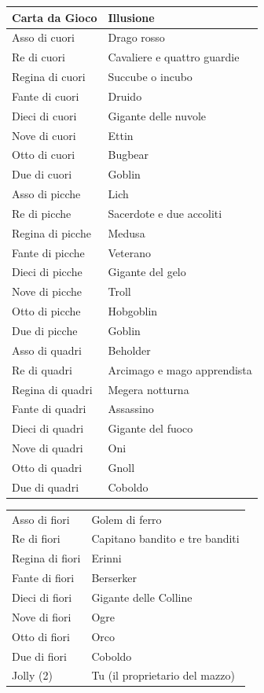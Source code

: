 \begin{multicols}{2}
\begin{tabularx}{0.48\textwidth}{ll}
\textbf{Carta da Gioco} & \textbf{Illusione} \\ \hline
Asso di cuori & Drago rosso \\
Re di cuori & Cavaliere e quattro guardie \\
Regina di cuori & Succube o incubo \\
Fante di cuori & Druido \\
Dieci di cuori & Gigante delle nuvole \\
Nove di cuori & Ettin \\
Otto di cuori & Bugbear \\
Due di cuori & Goblin \\
Asso di picche & Lich \\
Re di picche & Sacerdote e due accoliti \\
Regina di picche & Medusa \\
Fante di picche & Veterano \\
Dieci di picche & Gigante del gelo \\
Nove di picche & Troll \\
Otto di picche & Hobgoblin \\
Due di picche & Goblin \\
Asso di quadri & Beholder \\
Re di quadri & Arcimago e mago apprendista \\
Regina di quadri & Megera notturna \\
Fante di quadri & Assassino \\
Dieci di quadri & Gigante del fuoco \\
Nove di quadri & Oni \\
Otto di quadri & Gnoll \\
Due di quadri & Coboldo \\
\end{tabularx}
\begin{tabularx}{0.48\textwidth}{ll}
Asso di fiori & Golem di ferro \\
Re di fiori & Capitano bandito e tre banditi \\
Regina di fiori & Erinni \\
Fante di fiori & Berserker \\
Dieci di fiori & Gigante delle Colline \\
Nove di fiori & Ogre \\
Otto di fiori & Orco \\
Due di fiori & Coboldo \\
Jolly (2) & Tu (il proprietario del mazzo) \\
\end{tabularx}


\end{multicols}
